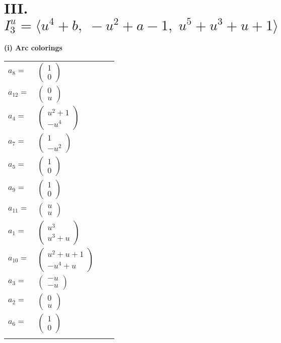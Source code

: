 \documentclass[1p]{elsarticle_modified}
\theoremstyle{definition}
\begin{document}
\centering \section*{III. $I^u_{3}= \langle u^4+b,\;- u^2+a-1,\;u^5+u^3+u+1 \rangle$}
\flushleft \textbf{(i) Arc colorings}\\
\begin{tabular}{m{7pt} m{180pt} m{7pt} m{180pt} }
\flushright $a_{8}=$&$\begin{pmatrix}1\\0\end{pmatrix}$ \\
\flushright $a_{12}=$&$\begin{pmatrix}0\\u\end{pmatrix}$ \\
\flushright $a_{4}=$&$\begin{pmatrix}u^2+1\\- u^4\end{pmatrix}$ \\
\flushright $a_{7}=$&$\begin{pmatrix}1\\- u^2\end{pmatrix}$ \\
\flushright $a_{5}=$&$\begin{pmatrix}1\\0\end{pmatrix}$ \\
\flushright $a_{9}=$&$\begin{pmatrix}1\\0\end{pmatrix}$ \\
\flushright $a_{11}=$&$\begin{pmatrix}u\\u\end{pmatrix}$ \\
\flushright $a_{1}=$&$\begin{pmatrix}u^3\\u^3+u\end{pmatrix}$ \\
\flushright $a_{10}=$&$\begin{pmatrix}u^2+u+1\\- u^4+u\end{pmatrix}$ \\
\flushright $a_{3}=$&$\begin{pmatrix}- u\\- u\end{pmatrix}$ \\
\flushright $a_{2}=$&$\begin{pmatrix}0\\u\end{pmatrix}$ \\
\flushright $a_{6}=$&$\begin{pmatrix}1\\0\end{pmatrix}$\\&\end{tabular}
\end{document}
